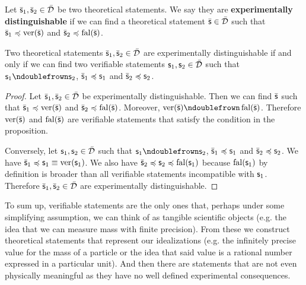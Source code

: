 \documentclass[11pt,letterpaper,fleqn]{memoir} %
\begin{document}
\begin{mathSection}
\begin{defn}\label{1_def_experimentally_distinguishable}
	Let $\bar{\mathsf{s}}_1, \bar{\mathsf{s}}_2 \in \bar{\mathcal{D}}$ be two theoretical statements. We say they are \textbf{experimentally distinguishable} if we can find a theoretical statement $\bar{\mathsf{s}} \in \bar{\mathcal{D}}$ such that $\bar{\mathsf{s}}_1 \preccurlyeq \operatorname{ver}(\bar{\mathsf{s}})$ and $\bar{\mathsf{s}}_2 \preccurlyeq \operatorname{fal}(\bar{\mathsf{s}})$.
\end{defn}
\begin{prop}\label{1_prop_experimentally_distinguishable_is_disjoint_approximations}
	Two theoretical statements $\bar{\mathsf{s}}_1, \bar{\mathsf{s}}_2 \in \bar{\mathcal{D}}$ are experimentally distinguishable if and only if we can find two verifiable statements $\mathsf{s}_1, \mathsf{s}_2 \in \bar{\mathcal{D}}$ such that $\stmt_1 \ncomp \stmt_2$, $\bar{\mathsf{s}}_1 \preccurlyeq \mathsf{s}_1$ and $\bar{\mathsf{s}}_2 \preccurlyeq \mathsf{s}_2$.
\end{prop}
\begin{proof}
	Let $\bar{\mathsf{s}}_1, \bar{\mathsf{s}}_2 \in \bar{\mathcal{D}}$ be experimentally distinguishable. Then we can find $\bar{\mathsf{s}}$ such that $\bar{\mathsf{s}}_1 \preccurlyeq \operatorname{ver}(\bar{\mathsf{s}})$ and $\bar{\mathsf{s}}_2 \preccurlyeq \operatorname{fal}(\bar{\mathsf{s}})$. Moreover, $\ver(\bar{\stmt}) \ncomp \fal(\bar{\stmt})$. Therefore $\operatorname{ver}(\bar{\mathsf{s}})$ and $\operatorname{fal}(\bar{\mathsf{s}})$ are verifiable statements that satisfy the condition in the proposition.
	
	Conversely, let $\mathsf{s}_1, \mathsf{s}_2 \in \bar{\mathcal{D}}$ such that $\stmt_1 \ncomp \stmt_2$, $\bar{\mathsf{s}}_1 \preccurlyeq \mathsf{s}_1$ and $\bar{\mathsf{s}}_2 \preccurlyeq \mathsf{s}_2$. We have $\bar{\mathsf{s}}_1 \preccurlyeq \mathsf{s}_1 \equiv \operatorname{ver}(\mathsf{s}_1)$. We also have $\bar{\mathsf{s}}_2 \preccurlyeq \mathsf{s}_2 \preccurlyeq \operatorname{fal}(\mathsf{s}_1)$ because $\operatorname{fal}(\mathsf{s}_1)$ by definition is broader than all verifiable statements incompatible with $\mathsf{s}_1$. Therefore $\bar{\mathsf{s}}_1, \bar{\mathsf{s}}_2 \in \bar{\mathcal{D}}$ are experimentally distinguishable.
\end{proof}
\end{mathSection}

To sum up, verifiable statements are the only ones that, perhaps under some simplifying assumption, we can think of as tangible scientific objects (e.g. the idea that we can measure mass with finite precision). From these we construct theoretical statements that represent our idealizations (e.g. the infinitely precise value for the mass of a particle or the idea that said value is a rational number expressed in a particular unit). And then there are statements that are not even physically meaningful as they have no well defined experimental consequences.
\end{document}
